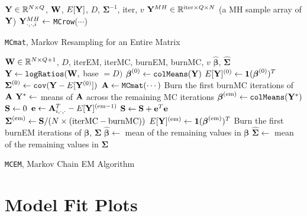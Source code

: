 \documentclass{template}
\begin{document}
\begin{algorithm}[ht!]
\begin{algorithmic}[1]
\Input $\mathbf{Y}\in\mathbb{R}^{N\times Q}$, $\mathbf{W}$, $E[\mathbf{Y}]$, $D$, $\boldsymbol{\Sigma}^{-1}$, iter, $v$
\Output $\mathbf{Y}^{MH}\in\mathbb{R}^{\text{iter}\times Q\times N}$ (a MH sample array of $\mathbf{Y}$)
\State $\mathbf{Y}^{MH}_{\cdot,\cdot,i} \gets$ \texttt{MCrow}($\cdots$)
\EndFor
{}
\end{algorithmic}
\caption{\texttt{MCmat}, Markov Resampling for an Entire Matrix}
\end{algorithm}


\begin{algorithm}[ht!]
\begin{algorithmic}[1]
\Input  $\mathbf{W}\in\mathbb{R}^{N\times Q+1}$, $D$,  iterEM, iterMC, burnEM, burnMC, $v$
\Output $\hat{\boldsymbol{\beta}}$, $\hat{\boldsymbol{\Sigma}}$
\State $\mathbf{Y}\gets \texttt{logRatios}(\mathbf{W},$ base $=D)$
\State $\boldsymbol{\beta}^{(0)} \gets \texttt{colMeans}(\mathbf{Y})$
\State $E[\mathbf{Y}]^{(0)} \gets \mathbf{1}(\boldsymbol{\beta}^{(0)})^T$
\State $\boldsymbol{\Sigma}^{(0)} \gets \texttt{cov}(\mathbf{Y}-E[\mathbf{Y}^{(0)}])$
\State $\mathbf{A}\gets \texttt{MCmat}(\cdots)$
\State Burn the first burnMC iterations of $\mathbf{A}$
\State $\mathbf{Y}^*\gets$ means of $\mathbf{A}$ across the remaining MC iterations
\State $\boldsymbol{\beta}^{(\text{em})} \gets \texttt{colMeans}(\mathbf{Y}^*)$
\State $\mathbf{S}\gets 0$
\State $\mathbf{e}\gets \mathbf{A}_{i,\cdot,\cdot}^T-E[\mathbf{Y}]^{(\text{em}-1)}$
\State $\mathbf{S}\gets \mathbf{S}+\mathbf{e}^T\mathbf{e}$
\EndFor
\State $\boldsymbol{\Sigma}^{(\text{em})}\gets \mathbf{S}/(N\times (\text{iterMC}-\text{burnMC}))$
\State $E[\mathbf{Y}]^{(\text{em})} \gets \mathbf{1}(\boldsymbol{\beta}^{(\text{em})})^T$
\EndFor
\State Burn the first burnEM iterations of $\boldsymbol{\beta}$, $\boldsymbol{\Sigma}$
\State $\hat{\boldsymbol{\beta}}\gets$ mean of the remaining values in $\boldsymbol{\beta}$
\State $\hat{\boldsymbol{\Sigma}}\gets$ mean of the remaining values in $\boldsymbol{\Sigma}$
\end{algorithmic}
\caption{\texttt{MCEM}, Markov Chain EM Algorithm}
\end{algorithm}



\FloatBarrier 
\section{Model Fit Plots}
\FloatBarrier
\end{document}
